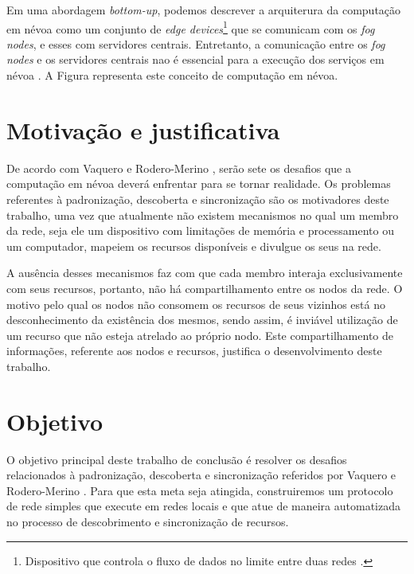 Em uma abordagem \textit{bottom-up}, podemos descrever a arquiterura da computação em névoa como um conjunto de \textit{edge devices}\footnote{Dispositivo que controla o fluxo de dados no limite entre duas redes \cite{edgeDevices}.} que se comunicam com os \textit{fog nodes}, e esses com servidores centrais.
Entretanto, a comunicação entre os \textit{fog nodes} e os servidores centrais nao é essencial para a execução dos serviços em névoa \cite{DBLP:journals/corr/RomanLM16}.
A Figura \cite{archfog:2017} representa este conceito de computação em névoa.

\section{Motivação e justificativa}

De acordo com Vaquero e Rodero-Merino \cite{Vaquero:2014}, serão sete os desafios que a computação em névoa deverá enfrentar para se tornar realidade.
Os problemas referentes à padronização, descoberta e sincronização são os motivadores deste trabalho, uma vez que atualmente não existem mecanismos
no qual um membro da rede, seja ele um dispositivo com limitações de memória e processamento ou um computador, mapeiem os recursos disponíveis e divulgue os seus na rede.

A ausência desses mecanismos faz com que cada membro interaja exclusivamente com seus recursos, portanto, não há compartilhamento entre os nodos da rede.
O motivo pelo qual os nodos não consomem os recursos de seus vizinhos está no desconhecimento da existência dos mesmos, sendo assim, é inviável utilização de um recurso que não esteja atrelado ao próprio nodo.
Este compartilhamento de informações, referente aos nodos e recursos, justifica o desenvolvimento deste trabalho.


\section{Objetivo}

O objetivo principal deste trabalho de conclusão é resolver os desafios relacionados à padronização, descoberta e sincronização referidos por Vaquero e Rodero-Merino \cite{Vaquero:2014}.
Para que esta meta seja atingida, construiremos um protocolo de rede simples que execute em redes locais e que atue de maneira automatizada no processo de
descobrimento e sincronização de recursos.











 
 
 
 
 
 
 
 










